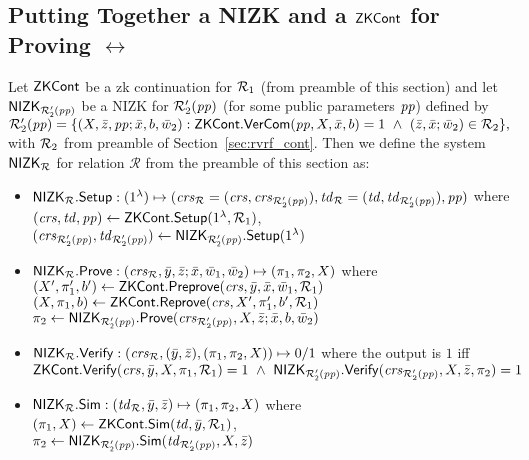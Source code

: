 \subsection{Putting Together a NIZK and a $\ZKCont$  for Proving $\rel$} \label{sec:nizkR}

Let $\ZKCont$ be a zk continuation for $\relone$ (from preamble of this section) and 
let $\nizktwo$ be a NIZK for $\reltwo'(\pp)$ (for some public parameters $\pp$) defined by \\ 
$\reltwo'(\pp) = \{(X, \barz, \pp; \barx, b, \baromega_2): \ZKCont.\VerifyCom(\pp, X, \barx, b) =1\ 
\wedge \ (\barz, \barx; \baromega_2) \in \reltwo \},$ 
\noindent with $\reltwo$ from preamble of Section~\ref{sec:rvrf_cont}. Then we define the system $\nizkR$ for relation $\mathcal{R}$ 
from the preamble of this section as:
\begin{itemize}
\item $\nizkR.\Setup: (1^{\lambda}) \mapsto (\crsR = (\crs,\crstwo), \twR = (\tw, \twtwo), \pp)$ where \\
$(\crs, \tw, \pp) \leftarrow \ZKCont.\Setup(1^{\lambda}, \relone)$, \\ $(\crstwo, \twtwo) \leftarrow \nizktwo.\Setup(1^{\lambda})$


\item $\nizkR.\Prove: (\crsR,\bary, \barz; \barx, \baromega_1, \baromega_2 ) \mapsto (\pi_1, \pi_2, X)$ where \\
$(X', \pi'_1, b')\leftarrow \ZKCont.\Preprove(\crs, \bar{y}, \bar{x}, \baromega_1, \relone)$ \\
$(X, \pi_1, b) \leftarrow \ZKCont.\Reprove(\crs, X', \pi_1', b', \relone)$ \\
$ \pi_2 \leftarrow \nizktwo.\Prove(\crstwo, X, \barz; \barx, b, \baromega_2)$ 

\item $\nizkR.\Verify: (\crsR,(\bary, \barz), (\pi_1, \pi_2, X)) \mapsto 0/1$ where the output is $1$ iff 
$\ZKCont.\Verify(\crs, \bar{y}, X, \pi_1, \relone) = 1 \  \wedge \ \nizktwo.\Verify(\crstwo, X, \barz, \pi_2) =1$

\item $\nizkR.\Sim: (\twR, \bary, \barz) \mapsto (\pi_1, \pi_2, X)$ where \\
$(\pi_1, X) \leftarrow \ZKCont.\Sim(\tw, \bary, \relone)$, \\
$\pi_2 \leftarrow \nizktwo.\Sim(\twtwo, X, \barz)$ 
 \end{itemize}

